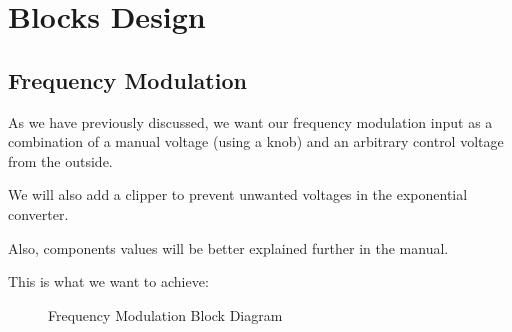 \chapter{Blocks Design}


\section{Frequency Modulation}

As we have previously discussed, we want our frequency modulation input as a combination
of a manual voltage (using a knob) and an arbitrary control voltage from the outside.

We will also add a clipper to prevent unwanted voltages in the exponential converter.

Also, components values will be better explained further in the manual.

This is what we want to achieve:

\begin{figure}[ht]
    \centering
    \def\svgscale{1.5}
    

    \caption{Frequency Modulation Block Diagram}
    \label{freq-block-diagram}
\end{figure}
